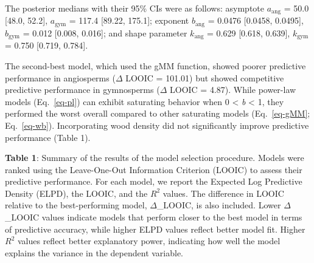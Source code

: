 \documentclass[
  12pt,
  letterpaper,
  DIV=11,
  numbers=noendperiod]{scrartcl}
\begin{document}
The posterior medians with their 95\% CIs were as follows: asymptote
\(a_{\text{ang}}\) = 50.0 {[}48.0, 52.2{]}, \(a_{\text{gym}}\) = 117.4
{[}89.22, 175.1{]}; exponent \(b_{\text{ang}}\) = 0.0476 {[}0.0458,
0.0495{]}, \(b_{\text{gym}}\) = 0.012 {[}0.008, 0.016{]}; and shape
parameter \(k_{\text{ang}}\) = 0.629 {[}0.618, 0.639{]},
\(k_{\text{gym}}\) = 0.750 {[}0.719, 0.784{]}.

The second-best model, which used the gMM function, showed poorer
predictive performance in angiosperms (\(\Delta\) LOOIC = 101.01) but
showed competitive predictive performance in gymnosperms (\(\Delta\)
LOOIC = 4.87). While power-law models (Eq.~\ref{eq-pl}) can exhibit
saturating behavior when 0 \textless{} \emph{b} \textless{} 1, they
performed the worst overall compared to other saturating models
(Eq.~\ref{eq-gMM}; Eq.~\ref{eq-wb}). Incorporating wood density did not
significantly improve predictive performance (Table 1).

\textbf{Table 1}: Summary of the results of the model selection
procedure. Models were ranked using the Leave-One-Out Information
Criterion (LOOIC) to assess their predictive performance. For each
model, we report the Expected Log Predictive Density (ELPD), the LOOIC,
and the \(R^2\) values. The difference in LOOIC relative to the
best-performing model, \(\Delta\)\_LOOIC, is also included. Lower
\(\Delta\)\_LOOIC values indicate models that perform closer to the best
model in terms of predictive accuracy, while higher ELPD values reflect
better model fit. Higher \(R^2\) values reflect better explanatory
power, indicating how well the model explains the variance in the
dependent variable.

\newpage

\begingroup\fontsize{10}{12}\selectfont
\end{document}
